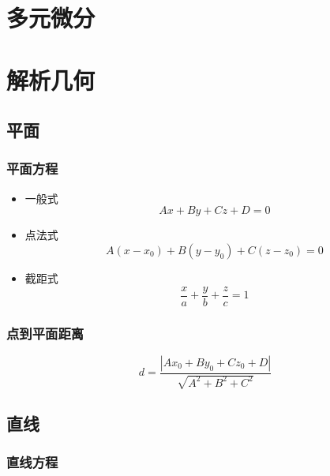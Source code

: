 \documentclass{article}
\begin{document}
\section{多元微分}

\section{解析几何}

\subsection{平面}

\subsubsection{平面方程}

\begin{itemize}
    \item 一般式 \begin{equation}
              A x + B y + C z + D = 0
          \end{equation}
    \item 点法式 \begin{equation}
              A (x - x_0) + B (y - y_0) + C (z - z_0) = 0
          \end{equation}
    \item 截距式 \begin{equation}
              \frac{x}{a} + \frac{y}{b} + \frac{z}{c} = 1
          \end{equation}
\end{itemize}

\subsubsection{点到平面距离}

\begin{equation}
    d = \frac{|A x_0 + B y_0 + C z_0 + D|}{\sqrt{A^2 + B^2 + C^2}}
\end{equation}

\subsection{直线}

\subsubsection{直线方程}
\end{document}
